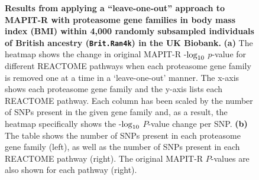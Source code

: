 \documentclass[10pt]{article}
\def\log{{\rm log}}
\begin{document}
\begin{figure}[H]
\caption{\textbf{Results from applying a ``leave-one-out'' approach to MAPIT-R with proteasome gene families in body mass index (BMI) within 4,000 randomly subsampled individuals of British ancestry (\texttt{Brit.Ran4k}) in the UK Biobank.} \textbf{(a)} The heatmap shows the change in original MAPIT-R -$\log_{10}$ $p$-value for different REACTOME pathways when each proteasome gene family is removed one at a time in a `leave-one-out' manner. The x-axis shows each proteasome gene family and the y-axis lists each REACTOME pathway. Each column has been scaled by the number of SNPs present in the given gene family and, as a result, the heatmap specifically shows the -$\log_{10}$ $P$-value change per SNP. \textbf{(b)} The table shows the number of SNPs present in each proteasome gene family (left), as well as the number of SNPs present in each REACTOME pathway (right). The original MAPIT-R $P$-values are also shown for each pathway (right).}
\label{InterPath-Supp-Figure-Prot-Heatplots-BritRan4000}
\end{figure}
\clearpage
\end{document}
